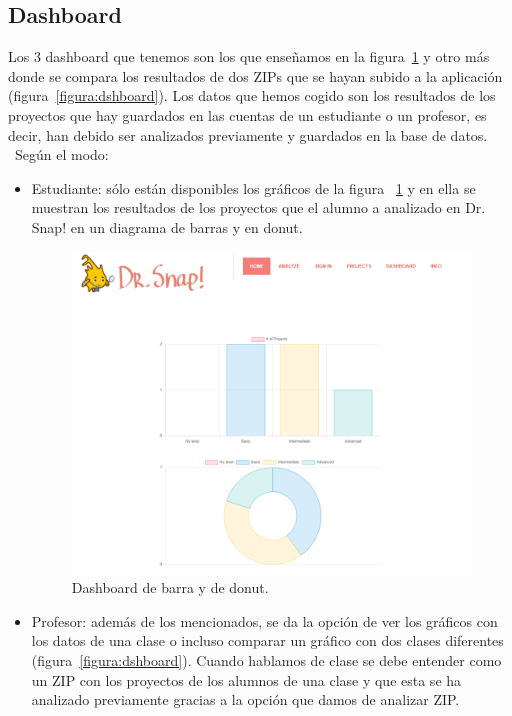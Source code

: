 \documentclass[a4paper, 12pt]{book}
\begin{document}
\subsection{Dashboard}
       Los 3 dashboard que tenemos son los que enseñamos en la figura~\ref{figura:dshboard2} y otro más donde se compara los resultados de dos ZIPs que se hayan subido a la aplicación (figura~\ref{figura:dshboard}). Los datos que hemos cogido son los resultados de los proyectos que hay guardados en las cuentas de un estudiante o un profesor, es decir, han debido ser analizados previamente y guardados en la base de datos. ~Según el modo:
    \begin{itemize}
        \item Estudiante: sólo están disponibles los gráficos de la figura ~\ref{figura:dshboard2} y en ella se muestran los resultados de los proyectos que el alumno a analizado en Dr. Snap! en un diagrama de barras y en donut.\\
        \begin{figure}[h]
            \centering
            \includegraphics[scale=0.4]{img/dashboard.PNG}
            \caption{Dashboard de barra y de donut.}
            \label{figura:dshboard2}
        \end{figure}
        \item Profesor: además de los mencionados, se da la opción de ver los gráficos con los datos de una clase o incluso comparar un gráfico con dos clases diferentes (figura~\ref{figura:dshboard}). Cuando hablamos de clase se debe entender como un ZIP con los proyectos de los alumnos de una clase y que esta se ha analizado previamente gracias a la opción que damos de analizar ZIP.

\end{itemize}
\end{document}
